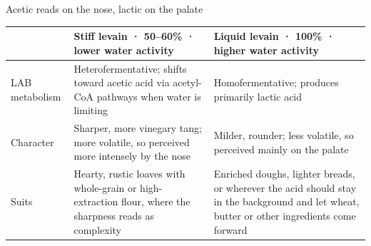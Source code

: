 \documentclass[aspectratio=169,11pt]{beamer}
\begin{document}
\begin{frame}{Acetic reads on the nose, lactic on the palate}
  \footnotesize
  \renewcommand{\arraystretch}{1.15}
  \begin{tabularx}{\textwidth}{@{}>{\bfseries\raggedright}p{1.9cm}LL@{}}
    \toprule
     & \textbf{Stiff levain} · 50--60\% · lower water activity
     & \textbf{Liquid levain} · 100\% · higher water activity \\
    \midrule
    LAB metabolism & Heterofermentative; shifts toward acetic acid via
      acetyl-CoA pathways when water is limiting
      & Homofermentative; produces primarily lactic acid \\
    Character & Sharper, more vinegary tang; more volatile, so perceived more
      intensely by the nose
      & Milder, rounder; less volatile, so perceived mainly on the palate \\
    Suits & Hearty, rustic loaves with whole-grain or high-extraction
      flour, where the sharpness reads as complexity
      & Enriched doughs, lighter breads, or wherever the acid should stay in
      the background and let wheat, butter or other ingredients come forward \\
    \bottomrule
  \end{tabularx}
\end{frame}
\end{document}
